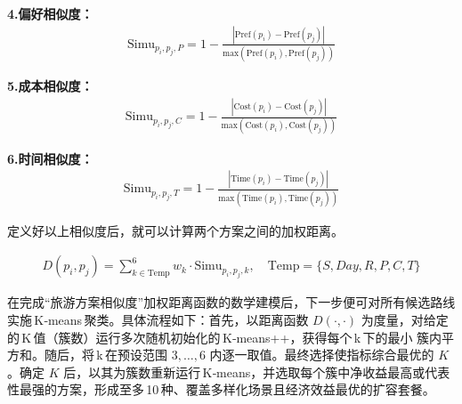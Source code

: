 \noindent\textbf{4.偏好相似度：}
\begin{equation}
  \begin{aligned}
    \text{Simu}_{p_{i},p_{j},P} = 1-\frac{|\text{Pref}(p_{i})-\text{Pref}(p_{j})|}{\text{max}(\text{Pref}(p_{i}),\text{Pref}(p_{j}))}
  \end{aligned}
\end{equation}

\noindent\textbf{5.成本相似度：}
\begin{equation}
  \begin{aligned}
    \text{Simu}_{p_{i},p_{j},C} = 1-\frac{|\text{Cost}(p_{i})-\text{Cost}(p_{j})|}{\text{max}(\text{Cost}(p_{i}),\text{Cost}(p_{j}))}
  \end{aligned}
\end{equation}

\noindent\textbf{6.时间相似度：}
\begin{equation}
  \begin{aligned}
    \text{Simu}_{p_{i},p_{j},T} = 1-\frac{|\text{Time}(p_{i})-\text{Time}(p_{j})|}{\text{max}(\text{Time}(p_{i}),\text{Time}(p_{j}))}
  \end{aligned}
\end{equation}

定义好以上相似度后，就可以计算两个方案之间的加权距离。

\begin{equation}
  \begin{aligned}
    D(p_{i},p_{j}) = \sum_{k\in \text{Temp}}^{6}w_{k}\cdot\text{Simu}_{p_{i},p_{j},k},\quad \text{Temp}=\{S,Day,R,P,C,T\}
  \end{aligned}
\end{equation}

在完成“旅游方案相似度”加权距离函数的数学建模后，下一步便可对所有候选路线实施 K‑means 聚类。具体流程如下：首先，以距离函数 $D(\cdot,\cdot)$ 为度量，对给定的 K 值（簇数）运行多次随机初始化的 K‑means++，获得每个 k 下的最小 簇内平方和。随后，将 k 在预设范围 $3,\dots ,6$ 内逐一取值。最终选择使指标综合最优的 $K$。确定 $K$ 后，以其为簇数重新运行 K‑means，并选取每个簇中净收益最高或代表性最强的方案，形成至多 10 种、覆盖多样化场景且经济效益最优的扩容套餐。




